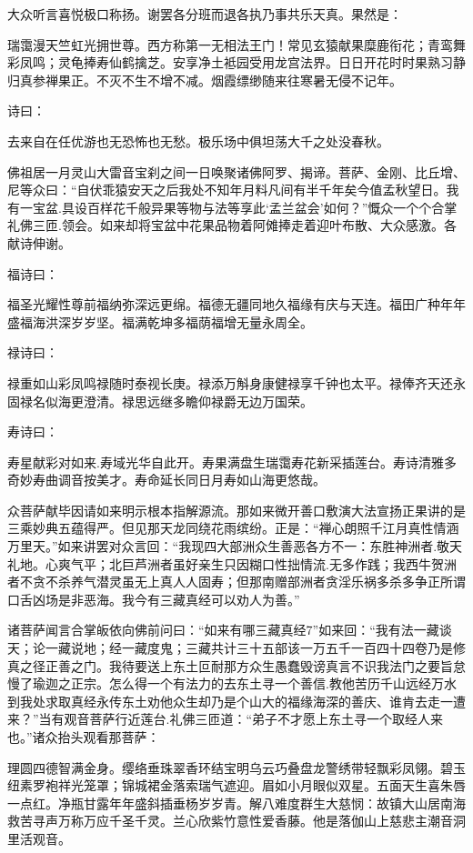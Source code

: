 \documentclass[12pt,UTF8]{ctexbook}
\begin{document}
{大众听言喜悦极口称扬。谢罢各分班而退各执乃事共乐天真。果然是：

瑞霭漫天竺虹光拥世尊。西方称第一无相法王门！常见玄猿献果糜鹿衔花；青鸾舞彩凤鸣；灵龟捧寿仙鹤擒芝。安享净土袛园受用龙宫法界。日日开花时时果熟习静归真参禅果正。不灭不生不增不减。烟霞缥缈随来往寒暑无侵不记年。

诗曰：

去来自在任优游也无恐怖也无愁。极乐场中俱坦荡大千之处没春秋。

佛祖居一月灵山大雷音宝刹之间一日唤聚诸佛阿罗、揭谛。菩萨、金刚、比丘增、尼等众曰：“自伏乖猿安天之后我处不知年月料凡间有半千年矣今值孟秋望日。我有一宝盆.具设百样花千般异果等物与法等享此‘孟兰盆会’如何？”慨众一个个合掌礼佛三匝.领会。如来却将宝盆中花果品物着阿傩捧走着迎叶布散、大众感激。各献诗伸谢。

福诗曰：

福圣光耀性尊前福纳弥深远更绵。福德无疆同地久福缘有庆与天连。福田广种年年盛福海洪深岁岁坚。福满乾坤多福荫福增无量永周全。

禄诗曰：

禄重如山彩凤鸣禄随时泰视长庚。禄添万斛身康健禄享千钟也太平。禄俸齐天还永固禄名似海更澄清。禄思远继多瞻仰禄爵无边万国荣。

寿诗曰：

寿星献彩对如来.寿域光华自此开。寿果满盘生瑞霭寿花新采插莲台。寿诗清雅多奇妙寿曲调音按美才。寿命延长同日月寿如山海更悠哉。

众菩萨献毕因请如来明示根本指解源流。那如来微开善口敷演大法宣扬正果讲的是三乘妙典五蕴得严。但见那天龙同绕花雨缤纷。正是：“禅心朗照千江月真性情涵万里天。”如来讲罢对众言回：“我现四大部洲众生善恶各方不一：东胜神洲者.敬天礼地。心爽气平；北巨芦洲者虽好亲生只因糊口性拙情流.无多作践；我西牛贺洲者不贪不杀养气潜灵虽无上真人人固寿；但那南赠部洲者贪淫乐祸多杀多争正所谓口舌凶场是非恶海。我今有三藏真经可以劝人为善。”

诸菩萨闻言合掌皈依向佛前问曰：“如来有哪三藏真经7”如来回：“我有法一藏谈天；论一藏说地；经一藏度鬼；三藏共计三十五部该一万五千一百四十四卷乃是修真之径正善之门。我待要送上东土叵耐那方众生愚蠢毁谤真言不识我法门之要旨怠慢了瑜迦之正宗。怎么得一个有法力的去东土寻一个善信.教他苦历千山远经万水到我处求取真经永传东土劝他众生却乃是个山大的福缘海深的善庆、谁肯去走一遭来？”当有观音菩萨行近莲台.礼佛三匝道：“弟子不才愿上东土寻一个取经人来也。”诸众抬头观看那菩萨：

理圆四德智满金身。缨络垂珠翠香环结宝明乌云巧叠盘龙警绣带轻飘彩凤翎。碧玉纽素罗袍祥光笼罩；锦城裙金落索瑞气遮迎。眉如小月眼似双星。五面天生喜朱唇一点红。净瓶甘露年年盛斜插垂杨岁岁青。解八难度群生大慈悯：故镇大山居南海救苦寻声万称万应千圣千灵。兰心欣紫竹意性爱香藤。他是落伽山上慈悲主潮音洞里活观音。

}
\end{document}
